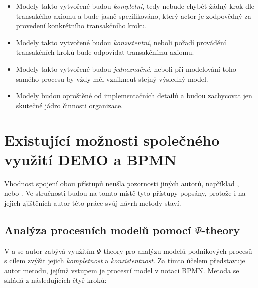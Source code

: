 \documentclass[]{article}
\newcommand{\ptheory}{$\Psi$-theory }
\begin{document}
\begin{itemize}
\item Modely takto vytvořené budou \textit{kompletní}, tedy nebude chybět žádný krok dle transakčího axiomu a bude jasně specifikováno, který actor je zodpovědný za provedení konkrétního transakčního kroku.
\item Modely takto vytvořené budou \textit{konzistentní}, neboli pořadí provádění transakčních kroků bude odpovídat transakčnímu axiomu.
\item Modely takto vytvořené budou \textit{jednoznačné}, neboli při modelování toho samého procesu by vždy měl vzniknout stejný výsledný model.
\item Modely budou oproštěné od implementačních detailů a budou zachycovat jen skutečné jádro činnosti organizace.
\end{itemize}



\section{Existující možnosti společného využití DEMO a BPMN} \label{sec:existujici_moznosti}
Vhodnost spojení obou přístupů neušla pozornosti jiných autorů, například \cite{VanNuffel2009}, \cite{Caetano2011} nebo \cite{Caetano2012}. Ve stručnosti budou na tomto místě tyto přístupy popsány, protože i na jejich zjištěních autor této práce svůj návrh metody staví.

\subsection{Analýza procesních modelů pomocí \ptheory} \label{sec:analyza_proc_modelu_psi}
V \cite{Caetano2012} a \cite{Caetano2011} se autor zabývá využitím \ptheory pro analýzu modelů podnikových procesů s cílem zvýšit jejich \textit{kompletnost} a \textit{konzistentnost}. Za tímto účelem představuje autor metodu, jejímž vstupem je procesní model v notaci BPMN. Metoda se skládá z následujících čtyř kroků:
\end{document}
